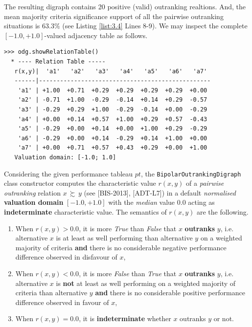 The resulting digraph contains 20 positive (valid) outranking realtions. And, the mean majority criteria significance support of all the pairwise outranking situations is $63.3\%$ (see Listing \ref{list:3.4}  Lines 8-9). We may inspect the complete $[-1.0,+1.0]$-valued adjacency table as follows.
 
\begin{lstlisting}[caption={Inspecting the valued adjacency table},label=list:3.5]
>>> odg.showRelationTable()
  * ---- Relation Table -----
   r(x,y)|  'a1'   'a2'   'a3'   'a4'   'a5'   'a6'   'a7'   
   ------|-------------------------------------------------
    'a1' | +1.00  +0.71  +0.29  +0.29  +0.29  +0.29  +0.00  
    'a2' | -0.71  +1.00  -0.29  -0.14  +0.14  +0.29  -0.57  
    'a3' | -0.29  +0.29  +1.00  -0.29  -0.14  +0.00  -0.29  
    'a4' | +0.00  +0.14  +0.57  +1.00  +0.29  +0.57  -0.43  
    'a5' | -0.29  +0.00  +0.14  +0.00  +1.00  +0.29  -0.29  
    'a6' | -0.29  +0.00  +0.14  -0.29  +0.14  +1.00  +0.00  
    'a7' | +0.00  +0.71  +0.57  +0.43  +0.29  +0.00  +1.00  
   Valuation domain: [-1.0; 1.0]
\end{lstlisting}

Considering the given performance tableau $pt$, the \texttt{BipolarOutrankingDigraph} class constructor computes the characteristic value $r(x,y)$ of a \emph{pairwise outranking} relation $x\, \succsim \,y$ (see [BIS-2013], [ADT-L7]) in a default {\em normalised\/} {\bf valuation domain} $[-1.0,+1.0]$ with the {\em median\/} value $0.0$ acting as {\bf indeterminate} characteristic value. The semantics of $r(x,y)$ are the following.
\begin{enumerate}
\item When $r(x,y) > 0.0$, it is more {\em True\/} than {\em False\/} that $x$ {\bf outranks} $y$, i.e. alternative $x$ is at least as well performing than alternative $y$ on a weighted majority of criteria {\bf and} there is no considerable negative performance difference observed in disfavour of $x$,
\item When $r(x,y) < 0.0$, it is more {\em False\/} than {\em True\/} that $x$ {\bf outranks} $y$, i.e. alternative $x$ is {\bf not} at least as well performing on a weighted majority of criteria than alternative $y$ {\bf and} there is no considerable positive performance difference observed in favour of $x$,
\item When $r(x,y) = 0.0$, it is {\bf indeterminate} whether $x$ outranks $y$ or not.
\end{enumerate}

